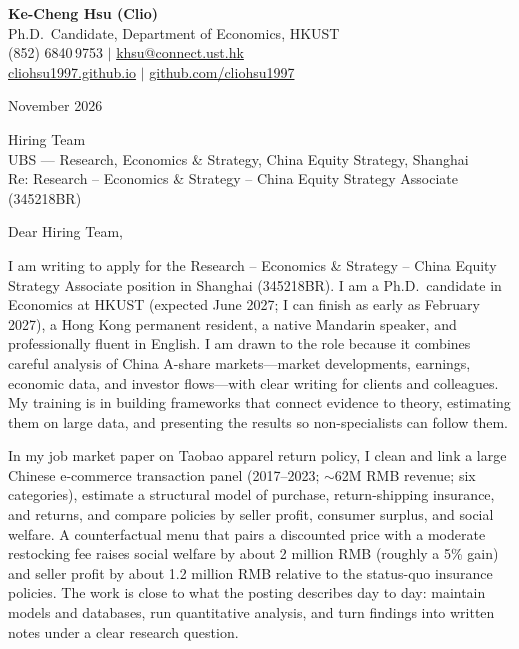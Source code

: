 \documentclass[11pt,letterpaper]{article}
\begin{document}
\noindent
{\bfseries Ke-Cheng Hsu (Clio)}\\
Ph.D.\ Candidate, Department of Economics, HKUST\\
(852) 6840\,9753 \quad $|$ \quad \href{mailto:khsu@connect.ust.hk}{khsu@connect.ust.hk}\\
\href{https://cliohsu1997.github.io/}{cliohsu1997.github.io} \quad $|$ \quad \href{https://github.com/cliohsu1997}{github.com/cliohsu1997}

\vspace{0.5em}
 November 2026

\vspace{0.35em}
\noindent
Hiring Team\\
UBS --- Research, Economics \& Strategy, China Equity Strategy, Shanghai\\
Re: Research -- Economics \& Strategy -- China Equity Strategy Associate (345218BR)

\vspace{0.2em}
Dear Hiring Team,

I am writing to apply for the Research -- Economics \& Strategy -- China Equity Strategy Associate position in Shanghai (345218BR). I am a Ph.D.\ candidate in Economics at HKUST (expected June 2027; I can finish as early as February 2027), a Hong Kong permanent resident, a native Mandarin speaker, and professionally fluent in English. I am drawn to the role because it combines careful analysis of China A-share markets---market developments, earnings, economic data, and investor flows---with clear writing for clients and colleagues. My training is in building frameworks that connect evidence to theory, estimating them on large data, and presenting the results so non-specialists can follow them.

In my job market paper on Taobao apparel return policy, I clean and link a large Chinese e-commerce transaction panel (2017--2023; \(\sim\)62M RMB revenue; six categories), estimate a structural model of purchase, return-shipping insurance, and returns, and compare policies by seller profit, consumer surplus, and social welfare. A counterfactual menu that pairs a discounted price with a moderate restocking fee raises social welfare by about 2 million RMB (roughly a 5\% gain) and seller profit by about 1.2 million RMB relative to the status-quo insurance policies. The work is close to what the posting describes day to day: maintain models and databases, run quantitative analysis, and turn findings into written notes under a clear research question.
\end{document}
